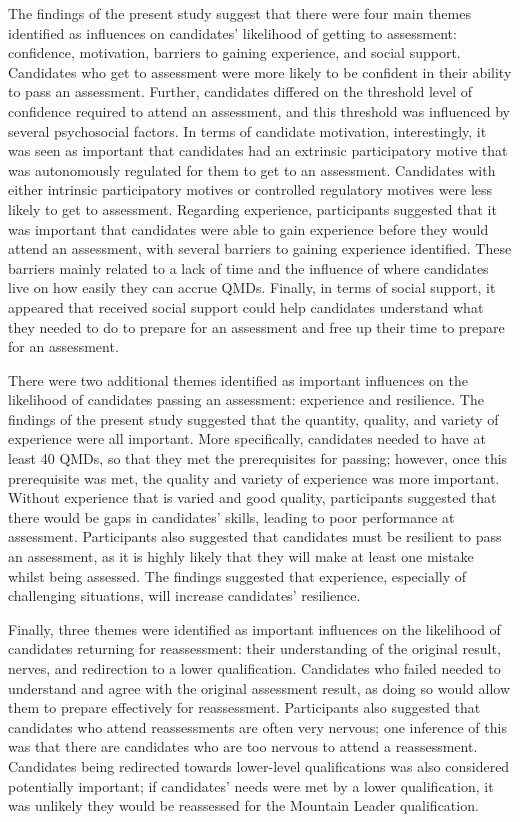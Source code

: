 \documentclass[
  12pt,
  a4paper,
]{book}
\begin{document}
The findings of the present study suggest that there were four main themes identified as influences on candidates' likelihood of getting to assessment: confidence, motivation, barriers to gaining experience, and social support. Candidates who get to assessment were more likely to be confident in their ability to pass an assessment. Further, candidates differed on the threshold level of confidence required to attend an assessment, and this threshold was influenced by several psychosocial factors. In terms of candidate motivation, interestingly, it was seen as important that candidates had an extrinsic participatory motive that was autonomously regulated for them to get to an assessment. Candidates with either intrinsic participatory motives or controlled regulatory motives were less likely to get to assessment. Regarding experience, participants suggested that it was important that candidates were able to gain experience before they would attend an assessment, with several barriers to gaining experience identified. These barriers mainly related to a lack of time and the influence of where candidates live on how easily they can accrue QMDs. Finally, in terms of social support, it appeared that received social support could help candidates understand what they needed to do to prepare for an assessment and free up their time to prepare for an assessment.

There were two additional themes identified as important influences on the likelihood of candidates passing an assessment: experience and resilience. The findings of the present study suggested that the quantity, quality, and variety of experience were all important. More specifically, candidates needed to have at least 40 QMDs, so that they met the prerequisites for passing; however, once this prerequisite was met, the quality and variety of experience was more important. Without experience that is varied and good quality, participants suggested that there would be gaps in candidates' skills, leading to poor performance at assessment. Participants also suggested that candidates must be resilient to pass an assessment, as it is highly likely that they will make at least one mistake whilst being assessed. The findings suggested that experience, especially of challenging situations, will increase candidates' resilience.

Finally, three themes were identified as important influences on the likelihood of candidates returning for reassessment: their understanding of the original result, nerves, and redirection to a lower qualification. Candidates who failed needed to understand and agree with the original assessment result, as doing so would allow them to prepare effectively for reassessment. Participants also suggested that candidates who attend reassessments are often very nervous; one inference of this was that there are candidates who are too nervous to attend a reassessment. Candidates being redirected towards lower-level qualifications was also considered potentially important; if candidates' needs were met by a lower qualification, it was unlikely they would be reassessed for the Mountain Leader qualification.
\end{document}
